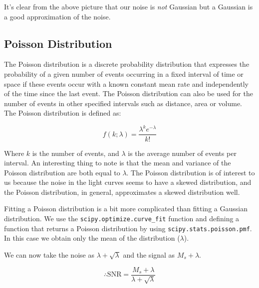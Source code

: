 \documentclass[11pt]{book} %
\begin{document}
It's clear from the above picture that our noise is \textit{not} Gaussian but a Gaussian is a good approximation of the noise.


\subsection{Poisson Distribution}

The Poisson distribution is a discrete probability distribution that expresses the probability of a given number of events occurring in a fixed interval of time or space if these events occur with a known constant mean rate and independently of the time since the last event. The Poisson distribution can also be used for the number of events in other specified intervals such as distance, area or volume. The Poisson distribution is defined as:

\begin{equation} \label{eq:Poisson}
    f(k; \lambda)=\frac{\lambda^k e^{-\lambda}}{k!}
\end{equation}
    
Where $k$ is the number of events, and $\lambda$ is the average number of events per interval. An interesting thing to note is that the mean and variance of the Poisson distribution are both equal to $\lambda$. The Poisson distribution is of interest to us because the noise in the light curves seems to have a skewed distribution, and the Poisson distribution, in general, approximates a skewed distribution well.

Fitting a Poisson distribution is a bit more complicated than fitting a Gaussian distribution. We use the \lstinline[language=Python]{scipy.optimize.curve_fit} function and defining a function that returns a Poisson distribution by using \lstinline[language=Python]{scipy.stats.poisson.pmf}. In this case we obtain only the mean of the distribution ($\lambda$). 

We can now take the noise as $\lambda+\sqrt{\lambda}$ and the signal as $M_s+\lambda$. 

\begin{equation}
    \therefore \text{SNR} = \frac{M_s+\lambda}{\lambda+\sqrt{\lambda}}
\end{equation}
\end{document}
